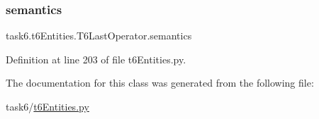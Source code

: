 \subsubsection{\texorpdfstring{semantics}{semantics}}
{\footnotesize\ttfamily task6.\+t6\+Entities.\+T6\+Last\+Operator.\+semantics}



Definition at line 203 of file t6\+Entities.\+py.



The documentation for this class was generated from the following file\+:\begin{DoxyCompactItemize}
\item 
task6/\hyperlink{t6Entities_8py}{t6\+Entities.\+py}\end{DoxyCompactItemize}
